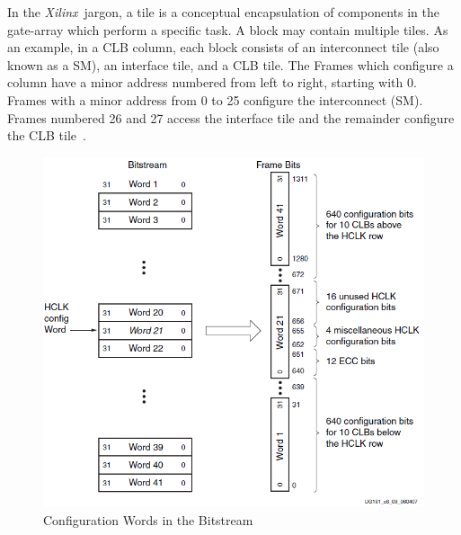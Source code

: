 \documentclass[conference]{IEEEtran}
\newcommand{\Xilinx}{\textit{\gls{Xilinx}}~}
\begin{document}
In the \Xilinx jargon, a tile is a conceptual encapsulation of components in the gate-array which perform a specific task.
A block may contain multiple tiles.
As an example, in a \acrfull{CLB} column, each block consists of an interconnect tile (also known as a \acrfull{SM}), an interface tile, and a \acrshort{CLB} tile.
The Frames which configure a column have a minor address numbered from left to right, starting with 0.
Frames with a minor address from 0 to 25 configure the interconnect (\acrshort{SM}).
Frames numbered 26 and 27 access the interface tile and the remainder configure the \acrshort{CLB} tile~\cite{virtex5ConfigGuide}.
\begin{figure}[h]
	\centering
	\includegraphics[width=0.96\linewidth]{Figures/frameTileMap}
	\caption[Configuration Words in the Bitstream~\cite{virtex5ConfigGuide}]{Configuration Words in the Bitstream~\cite{virtex5ConfigGuide}}
	\label{fig:frameTileMap}
\end{figure}
\end{document}
